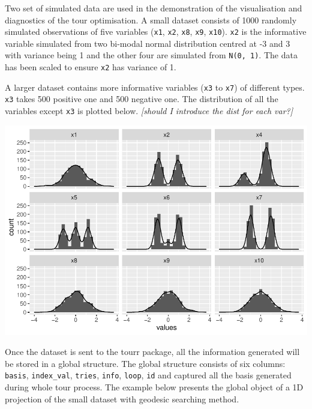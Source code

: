 \documentclass[12pt]{article}
\newenvironment{Shaded}{\begin{snugshade}}{\end{snugshade}}
\newcommand{\DecValTok}[1]{\textcolor[rgb]{0.00,0.00,0.81}{#1}}
\newcommand{\KeywordTok}[1]{\textcolor[rgb]{0.13,0.29,0.53}{\textbf{#1}}}
\newcommand{\NormalTok}[1]{#1}
\newcommand{\OperatorTok}[1]{\textcolor[rgb]{0.81,0.36,0.00}{\textbf{#1}}}
\newcommand{\StringTok}[1]{\textcolor[rgb]{0.31,0.60,0.02}{#1}}
\begin{document}
Two set of simulated data are used in the demonstration of the
visualisation and diagnostics of the tour optimisation. A small dataset
consists of 1000 randomly simulated observations of five variables
(\texttt{x1}, \texttt{x2}, \texttt{x8}, \texttt{x9}, \texttt{x10}).
\texttt{x2} is the informative variable simulated from two bi-modal
normal distribution centred at -3 and 3 with variance being 1 and the
other four are simulated from \texttt{N(0,\ 1)}. The data has been
scaled to ensure \texttt{x2} has variance of 1.

A larger dataset contains more informative variables (\texttt{x3} to
\texttt{x7}) of different types. \texttt{x3} takes 500 positive one and
500 negative one. The distribution of all the variables except
\texttt{x3} is plotted below. \emph{{[}should I introduce the dist for
each var?{]}}

\includegraphics{paper_files/figure-latex/origin-data-1.pdf}

Once the dataset is sent to the tourr package, all the information
generated will be stored in a global structure. The global structure
consists of six columns: \texttt{basis}, \texttt{index\_val},
\texttt{tries}, \texttt{info}, \texttt{loop}, \texttt{id} and captured
all the basis generated during whole tour process. The example below
presents the global object of a 1D projection of the small dataset with
geodesic searching method.

\begin{Shaded}
\end{Shaded}
\end{document}
